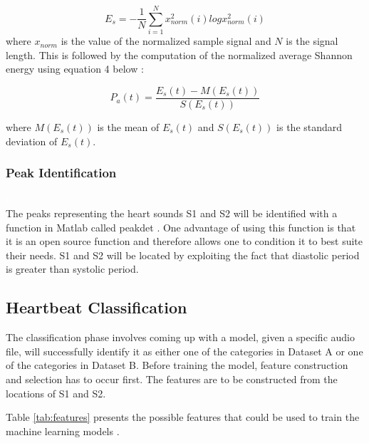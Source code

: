\documentclass[10pt,twocolumn]{witseiepaper}
\begin{document}
\begin{equation}
    E_s = -\frac{1}{N}\sum_{i=1}^{N} x_{norm}^{2}(i)logx_{norm}^{2}(i)
\end{equation}{}
 where \(x_{norm}\) is the value of the normalized sample signal and \(N\) is the signal length. This is followed by the computation of the normalized average Shannon energy using equation 4 below \cite{liang1997heart}:
 
 \begin{equation}
     P_a(t) = \frac{E_s(t)-M(E_s(t))}{S(E_s(t))}
 \end{equation}{}
 
 where \(M(E_s(t))\) is the mean of \(E_s(t)\) and \(S(E_s(t))\) is the standard deviation of \(E_s(t)\).
 
 \subsubsection{Peak Identification}
\textcolor{white}{B} \\ 
 The peaks representing the heart sounds S1 and S2 will be identified with a function in Matlab called peakdet \cite{gomes2012classifying}. One advantage of using this function is that it is an open source function and therefore allows one to condition it to best suite their needs. S1 and S2 will be located by exploiting the fact that diastolic period is greater than systolic period.
 
\subsection{Heartbeat Classification}
The classification phase involves coming up with a model, given a specific audio file, will successfully identify it as either one of the categories in Dataset A or one of the categories in Dataset B. Before training the model, feature construction and selection has to occur first. The features are to be constructed from the locations of S1 and S2.

Table \ref{tab:features} presents the possible features that could be used to train the machine learning models \cite{gomes2012classifying}.
\end{document}
